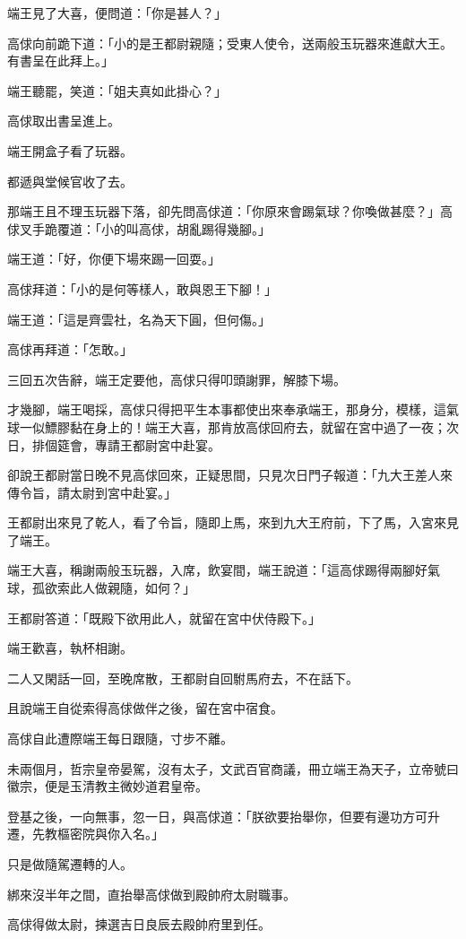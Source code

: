 \documentclass[11pt,a4paper]{article}
\begin{document}
端王見了大喜，便問道：「你是甚人？」

高俅向前跪下道：「小的是王都尉親隨；受東人使令，送兩般玉玩器來進獻大王。有書呈在此拜上。」

端王聽罷，笑道：「姐夫真如此掛心？」

高俅取出書呈進上。

端王開盒子看了玩器。

都遞與堂候官收了去。

那端王且不理玉玩器下落，卻先問高俅道：「你原來會踢氣球？你喚做甚麼？」高俅叉手跪覆道：「小的叫高俅，胡亂踢得幾腳。」

端王道：「好，你便下場來踢一回耍。」

高俅拜道：「小的是何等樣人，敢與恩王下腳！」

端王道：「這是齊雲社，名為天下圓，但何傷。」

高俅再拜道：「怎敢。」

三回五次告辭，端王定要他，高俅只得叩頭謝罪，解膝下場。

才幾腳，端王喝採，高俅只得把平生本事都使出來奉承端王，那身分，模樣，這氣球一似鰾膠黏在身上的！端王大喜，那肯放高俅回府去，就留在宮中過了一夜；次日，排個筵會，專請王都尉宮中赴宴。

卻說王都尉當日晚不見高俅回來，正疑思間，只見次日門子報道：「九大王差人來傳令旨，請太尉到宮中赴宴。」

王都尉出來見了乾人，看了令旨，隨即上馬，來到九大王府前，下了馬，入宮來見了端王。

端王大喜，稱謝兩般玉玩器，入席，飲宴間，端王說道：「這高俅踢得兩腳好氣球，孤欲索此人做親隨，如何？」

王都尉答道：「既殿下欲用此人，就留在宮中伏侍殿下。」

端王歡喜，執杯相謝。

二人又閑話一回，至晚席散，王都尉自回駙馬府去，不在話下。

且說端王自從索得高俅做伴之後，留在宮中宿食。

高俅自此遭際端王每日跟隨，寸步不離。

未兩個月，哲宗皇帝晏駕，沒有太子，文武百官商議，冊立端王為天子，立帝號曰徽宗，便是玉清教主微妙道君皇帝。

登基之後，一向無事，忽一日，與高俅道：「朕欲要抬舉你，但要有邊功方可升遷，先教樞密院與你入名。」

只是做隨駕遷轉的人。

綁來沒半年之間，直抬舉高俅做到殿帥府太尉職事。

高俅得做太尉，揀選吉日良辰去殿帥府里到任。
\end{document}
